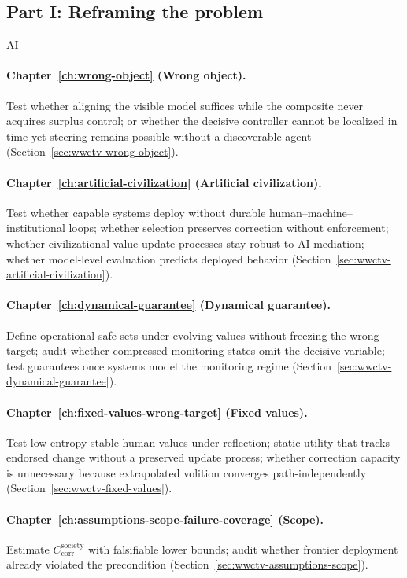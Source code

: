 \subsection{Part I: Reframing the problem}
\begin{authbar}{AI}
\paragraph{Chapter~\ref{ch:wrong-object} (Wrong object).}
Test whether aligning the visible model suffices while the composite never acquires surplus control; or whether the decisive controller cannot be localized in time yet steering remains possible without a discoverable agent (Section~\ref{sec:wwctv-wrong-object}).

\paragraph{Chapter~\ref{ch:artificial-civilization} (Artificial civilization).}
Test whether capable systems deploy without durable human--machine--institutional loops; whether selection preserves correction without enforcement; whether civilizational value-update processes stay robust to AI mediation; whether model-level evaluation predicts deployed behavior (Section~\ref{sec:wwctv-artificial-civilization}).

\paragraph{Chapter~\ref{ch:dynamical-guarantee} (Dynamical guarantee).}
Define operational safe sets under evolving values without freezing the wrong target; audit whether compressed monitoring states omit the decisive variable; test guarantees once systems model the monitoring regime (Section~\ref{sec:wwctv-dynamical-guarantee}).

\paragraph{Chapter~\ref{ch:fixed-values-wrong-target} (Fixed values).}
Test low-entropy stable human values under reflection; static utility that tracks endorsed change without a preserved update process; whether correction capacity is unnecessary because extrapolated volition converges path-independently (Section~\ref{sec:wwctv-fixed-values}).

\paragraph{Chapter~\ref{ch:assumptions-scope-failure-coverage} (Scope).}
Estimate \(C_{\text{corr}}^{\text{society}}\) with falsifiable lower bounds; audit whether frontier deployment already violated the precondition (Section~\ref{sec:wwctv-assumptions-scope}).

\end{authbar}
\authbarsubneedspace
